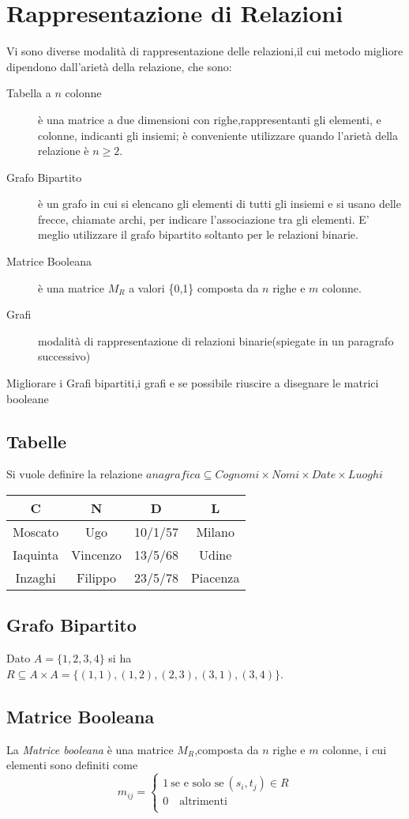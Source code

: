 \section{Rappresentazione di Relazioni}
Vi sono diverse modalità di rappresentazione delle relazioni,il cui metodo migliore
dipendono dall'arietà della relazione, che sono:
\begin{description}
    \item[Tabella a $n$ colonne] è una matrice a due dimensioni con righe,rappresentanti
          gli elementi, e colonne, indicanti gli insiemi; è conveniente utilizzare
          quando l'arietà della relazione è $n \geq 2$.
    \item[Grafo Bipartito] è un grafo in cui si elencano gli elementi di tutti gli insiemi
         e si usano delle frecce, chiamate archi, per indicare l'associazione tra gli elementi.
         E' meglio utilizzare il grafo bipartito soltanto per le relazioni binarie.
    \item[Matrice Booleana] è una matrice $M_R$ a valori \{0,1\} composta da $n$ righe e $m$ colonne.
    \item[Grafi] modalità di rappresentazione di relazioni binarie(spiegate in un paragrafo successivo)
\end{description}
Migliorare i Grafi bipartiti,i grafi e se possibile riuscire a disegnare le matrici booleane
\subsection{Tabelle}
Si vuole definire la relazione $anagrafica \subseteq Cognomi \times Nomi \times Date \times Luoghi$

\begin{tabular}{cccc}
\toprule
C & N & D & L \\
\midrule
Moscato & Ugo & 10/1/57 & Milano \\
Iaquinta & Vincenzo & 13/5/68 & Udine \\
Inzaghi & Filippo & 23/5/78 & Piacenza \\
\bottomrule
\end{tabular}

\subsection{Grafo Bipartito}
Dato  $A = \{ 1,2,3,4 \}$ si ha $R \subseteq A \times A = \{ (1,1),(1,2),(2,3),(3,1),(3,4) \}$.


\subsection{Matrice Booleana}
La \emph{Matrice booleana} è una matrice $M_R$,composta da $n$ righe e $m$ colonne,
i cui elementi sono definiti come
\begin{equation*}
    m_{ij} = \begin{cases} 1 \ \text{se e solo se} \ (s_i,t_j) \in R \\
                           0 \quad \text{altrimenti} \\
             \end{cases}
\end{equation*}


